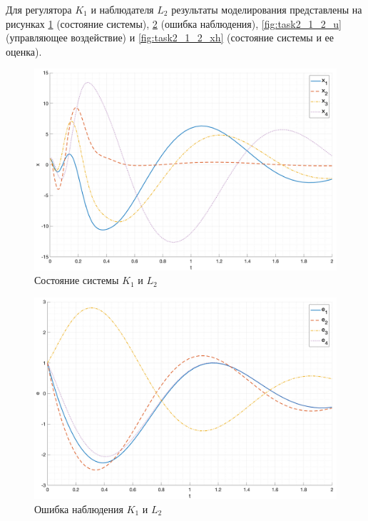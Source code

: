 Для регулятора $K_1$ и наблюдателя $L_2$ результаты моделирования представлены на рисунках \ref{fig:task2_1_2_x} 
(состояние системы), \ref{fig:task2_1_2_e} (ошибка наблюдения), \ref{fig:task2_1_2_u} (управляющее воздействие) и \ref{fig:task2_1_2_xh} 
(состояние системы и ее оценка).
\begin{figure}[ht!]
    \centering
    \includegraphics[width=\textwidth]{media/plots/task2_2_x.png}
    \caption{Состояние системы $K_1$ и $L_2$}
    \label{fig:task2_1_2_x}
\end{figure}
\begin{figure}[ht!]
    \centering
    \includegraphics[width=\textwidth]{media/plots/task2_2_e.png}
    \caption{Ошибка наблюдения $K_1$ и $L_2$}
    \label{fig:task2_1_2_e}
\end{figure}

